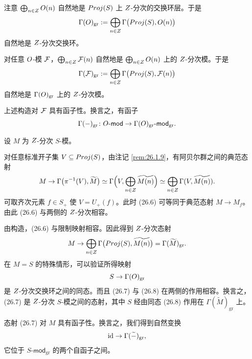\begin{construction}\label{con:26.3.1}
注意 $\bigoplus_{n \in Z} O(n)$ 自然地是 $Proj(S)$ 上 $Z$-分次的交换环层。于是
\[
\Gamma(O)_{\mathrm{gr}} := \bigoplus_{n \in Z} \Gamma\bigl(Proj(S), O(n)\bigr)
\]
自然地是 $Z$-分次交换环。

对任意 $O$-模 $\mathcal{F}$，$\bigoplus_{n \in Z} \mathcal{F}(n)$ 自然地是 $\bigoplus_{n \in Z} O(n)$ 上的 $Z$-分次模。于是
\[
\Gamma(\mathcal{F})_{\mathrm{gr}} := \bigoplus_{n \in Z} \Gamma\bigl(Proj(S), \mathcal{F}(n)\bigr)
\]
自然地是 $\Gamma(O)_{\mathrm{gr}}$ 上的 $Z$-分次模。

上述构造对 $\mathcal{F}$ 具有函子性。换言之，有函子
\[
\Gamma(-)_{\mathrm{gr}} \colon O\text{-}\mathsf{mod} \to \Gamma(O)_{\mathrm{gr}}\text{-}\mathsf{mod}_{\mathrm{gr}}.
\]
\end{construction}

\begin{construction}\label{con:26.3.2}
设 $M$ 为 $Z$-分次 $S$-模。

对任意标准开子集 $V \subseteq Proj(S)$，由注记 \ref{rem:26.1.9}，有阿贝尔群之间的典范态射
\begin{equation}\label{eq:26.6}
M \to \Gamma\bigl(\pi^{-1}(V), \widetilde{M}\bigr) \simeq \Gamma\Bigl(V, \bigoplus_{n \in Z} \widetilde{M(n)}\Bigr) \simeq \bigoplus_{n \in Z} \Gamma(V, \widetilde{M(n)}).
\end{equation}
可取齐次元素 $f \in S_+$ 使 $V = U_+(f)$。此时 (26.6) 可等同于典范态射 $M \to M_f$。由此 (26.6) 与两侧的 $Z$-分次相容。

由构造，(26.6) 与限制映射相容。因此得到 $Z$-分次态射
\begin{equation}\label{eq:26.7}
M \to \bigoplus_{n \in Z} \Gamma\bigl(Proj(S), \widetilde{M(n)}\bigr) = \Gamma(\widetilde{M})_{\mathrm{gr}}.
\end{equation}
在 $M = S$ 的特殊情形，可以验证所得映射
\begin{equation}\label{eq:26.8}
S \to \Gamma(O)_{\mathrm{gr}}
\end{equation}
是 $Z$-分次交换环之间的同态。而且 (26.7) 与 (26.8) 在两侧的作用相容。换言之，(26.7) 是 $Z$-分次 $S$-模之间的态射，其中 $S$ 经由同态 (26.8) 作用在 $\Gamma(\widetilde{M})_{\mathrm{gr}}$ 上。

态射 (26.7) 对 $M$ 具有函子性。换言之，我们得到自然变换
\begin{equation}\label{eq:26.9}
\operatorname{id} \to \Gamma(\widetilde{-})_{\mathrm{gr}},
\end{equation}
它位于 $S\text{-}\mathsf{mod}_{\mathrm{gr}}$ 的两个自函子之间。
\end{construction}

